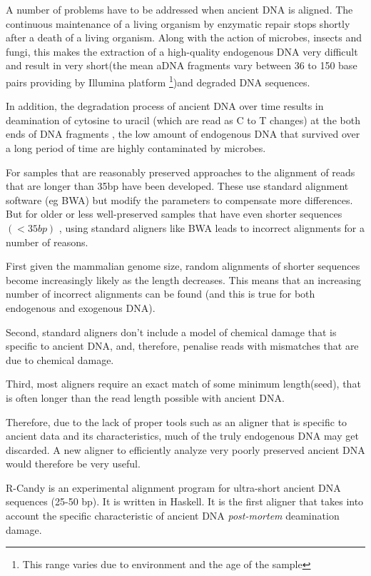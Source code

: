 \documentclass[11pt,a4paper]{report}
\begin{document}
A number of problems have to be addressed when ancient DNA is aligned.
The continuous maintenance of a living organism by enzymatic repair stops 
shortly after a death of a living organism. Along with the action of
microbes, insects and fungi, this makes the extraction of a 
high-quality endogenous DNA very difficult and result in very short(the 
mean aDNA fragments vary between 36 to 150 base pairs providing by Illumina 
platform\cite{rizzi2012ancient} \footnote{This range varies due to environment 
and the age of the sample})and degraded DNA sequences\cite{paabo2004genetic}.
 
In addition, the degradation process of ancient DNA over time results 
in deamination of cytosine to uracil (which are read as C to T changes) 
at the both ends of DNA fragments \cite{futureofaDNA}, the low amount 
of endogenous DNA that survived over a long period of time are highly 
contaminated \cite{paabo2004genetic}\cite{aDNA}by microbes.

For samples that are reasonably preserved approaches to the alignment
of reads that are longer than 35bp have been developed. These use standard
alignment software (eg BWA) but modify the parameters to compensate more 
differences. But for older or less well-preserved samples that have even
shorter sequences $(<35 bp)$ \cite{meyer2014mitochondrial}, using standard
aligners like BWA leads to incorrect alignments for a number of reasons.

First given the mammalian genome size, random alignments of shorter 
sequences become increasingly likely as the length decreases. 
This means that an increasing number of incorrect alignments can be 
found (and this is true for both endogenous and exogenous DNA).

Second, standard aligners don't include a model of chemical damage that 
is specific to ancient DNA, and, therefore, penalise reads with mismatches
that are due to chemical damage.

Third, most aligners require an exact match of some minimum length(seed), 
that is often longer than the read length possible with ancient DNA.

Therefore, due to the lack of proper tools such as an aligner that is 
specific to ancient data and its characteristics, much of the truly 
endogenous DNA may get discarded. A new aligner to efficiently analyze 
very poorly preserved ancient DNA would therefore be very useful.

R-Candy is an experimental alignment program for ultra-short ancient DNA sequences 
(25-50 bp). It is written in Haskell. It is the first aligner that takes 
into account the specific characteristic of ancient DNA \emph{post-mortem} 
deamination damage.
\end{document}
